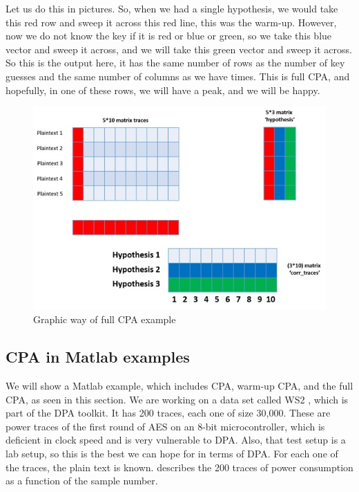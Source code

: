 Let us do this in pictures. So, when we had a single hypothesis, we would take
this red row and sweep it across this red line, this was the warm-up. However, now
we do not know the key if it is red or blue or green, so we take this blue vector
and sweep it across, and we will take this green vector and sweep it across. So
this is the output here, it has the same number of rows as the number of key
guesses and the same number of columns as we have times. This is full CPA, and
hopefully, in one of these rows, we will have a peak, and we will be happy. 

\begin{figure}[!ht]
    \centering
    \includegraphics[width=1.0\textwidth]{images/chapter8/cpa_example.jpg}
    \caption{Graphic way of full CPA example} \label{c8_cpa_example:fig}
\end{figure}

\subsection{CPA in Matlab examples}\label{c6_Matlab_CPA_example:subsec}

We will show a Matlab example, which includes CPA, warm-up CPA, and the full CPA, as
seen in this section. We are working on a data set called WS2 \cite{WS2}, which is part of
the DPA toolkit. It has 200 traces, each one of size 30,000. These are power
traces of the first round of AES on an 8-bit microcontroller, which is deficient
in clock speed and is very vulnerable to DPA. Also, that test setup is a
lab setup, so this is the best we can hope for in terms of DPA. For each one of
the traces, the plain text is known. 
describes the 200 traces of power consumption as a function of the sample number. 

